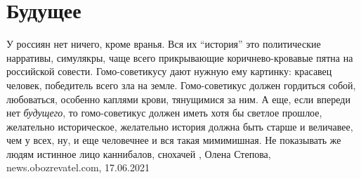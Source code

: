  
 
 
 
 
\chapter{Будущее}
\label{sec:slova.buduschee}

У россиян нет ничего, кроме вранья. Вся их \enquote{история} это политические
нарративы, симулякры, чаще всего прикрывающие коричнево-кровавые пятна на
российской совести. Гомо-советикусу дают нужную ему картинку: красавец человек,
победитель всего зла на земле. Гомо-советикус должен гордиться собой,
любоваться, особенно каплями крови, тянущимися за ним.  А еще, если впереди нет
\emph{будущего}, то гомо-советикус должен иметь хотя бы светлое прошлое, желательно
историческое, желательно история должна быть старше и величавее, чем у всех,
ну, и еще человечнее и вся такая мимимишная. Не показывать же людям истинное
лицо каннибалов, снохачей
, 
Олена Степова, news.obozrevatel.com, 17.06.2021

